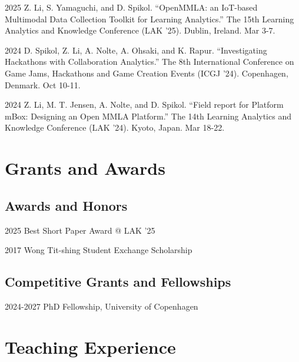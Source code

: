 \documentclass[11pt,letterpaper]{report}
\begin{document}
    \begin{tablist}
        \item[2025] \tab{}Z. Li, S. Yamaguchi, and D. Spikol. \enquote{OpenMMLA: an IoT-based Multimodal Data Collection Toolkit for Learning Analytics.} The 15th Learning Analytics and Knowledge Conference (LAK '25). Dublin, Ireland. Mar 3-7.
        \item[2024] \tab{}D. Spikol, Z. Li, A. Nolte, A. Ohsaki, and K. Rapur. \enquote{Investigating Hackathons with Collaboration Analytics.} The 8th International Conference on Game Jams, Hackathons and Game Creation Events (ICGJ '24). Copenhagen, Denmark. Oct 10-11.
        \item[2024] \tab{}Z. Li, M. T. Jensen, A. Nolte, and D. Spikol. \enquote{Field report for Platform mBox: Designing an Open MMLA Platform.} The 14th Learning Analytics and Knowledge Conference (LAK '24). Kyoto, Japan. Mar 18-22.
    \end{tablist}



    \section*{Grants and Awards}

    \subsection*{Awards and Honors}

    \begin{tablist}
        \item[2025] \tab{}Best Short Paper Award @ LAK '25
        \item[2017] \tab{}Wong Tit-shing Student Exchange Scholarship
    \end{tablist}

    \subsection*{Competitive Grants and Fellowships}

    \begin{tablist}

        \item[2024-2027] \tab{}PhD Fellowship, University of Copenhagen

    \end{tablist}



    \section*{Teaching Experience}
\end{document}
